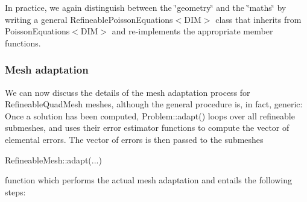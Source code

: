 In practice, we again distinguish between the \char`\"{}geometry\char`\"{} and the \char`\"{}maths\char`\"{} by writing a general {\ttfamily Refineable\+Poisson\+Equations$<$\+D\+I\+M$>$} class that inherits from {\ttfamily Poisson\+Equations$<$\+D\+I\+M$>$} and re-\/implements the appropriate member functions.\hypertarget{index_RefineableQuadMesh_adaption_section}{}\subsubsection{Mesh adaptation}\label{index_RefineableQuadMesh_adaption_section}
We can now discuss the details of the mesh adaptation process for {\ttfamily Refineable\+Quad\+Mesh} meshes, although the general procedure is, in fact, generic\+: Once a solution has been computed, {\ttfamily Problem\+::adapt()} loops over all refineable submeshes, and uses their error estimator functions to compute the vector of elemental errors. The vector of errors is then passed to the submeshes\textquotesingle{} 
\begin{DoxyCode}
RefineableMesh::adapt(...) 
\end{DoxyCode}
 function which performs the actual mesh adaptation and entails the following steps\+:
